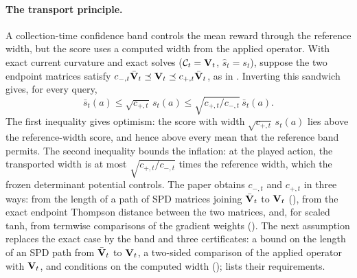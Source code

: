 \paragraph{The transport principle.}
A collection-time confidence band controls the mean reward through the
reference width, but the score uses a computed width from the applied
operator. With exact current curvature and exact solves ($\mathcal{C}_t=\mathbf{V}_t$,
$\hat s_t=s_t$), suppose the two endpoint matrices satisfy
$c_{-,t}\bar{\mathbf{V}}_t\preceq\mathbf{V}_t\preceq c_{+,t}\bar{\mathbf{V}}_t$, as in
. Inverting this sandwich gives, for every
query,
\[
 \bar s_t(a)\le\sqrt{c_{+,t}}\,s_t(a)\le\sqrt{c_{+,t}/c_{-,t}}\,\bar s_t(a).
\]
The first inequality gives optimism: the score with width
$\sqrt{c_{+,t}}\,s_t(a)$ lies above the reference-width score, and hence above
every mean that the reference band permits. The second inequality bounds the
inflation: at the played action, the transported width is at most
$\sqrt{c_{+,t}/c_{-,t}}$ times the reference width, which the frozen
determinant potential controls. The paper obtains $c_{-,t}$ and $c_{+,t}$ in
three ways: from the length of a path of SPD matrices joining $\bar{\mathbf{V}}_t$ to
$\mathbf{V}_t$ (), from the exact endpoint Thompson
distance between the two matrices, and, for scaled tanh, from termwise
comparisons of the gradient weights
(). The next
assumption replaces the exact case by the band and three certificates: a bound
on the length of an SPD path from $\bar{\mathbf{V}}_t$ to $\mathbf{V}_t$, a two-sided comparison
of the applied operator with $\mathbf{V}_t$, and conditions on the computed width
();
 lists their requirements.

